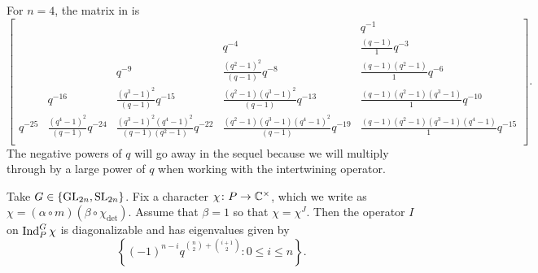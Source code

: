\begin{example}
    For $n=4$, the matrix in  is
    \[\begin{bmatrix}  &   &   &   & q^{-1}\\  &   &   & q^{-4}  & \frac{ ( q - 1 ) }{1} q^{-3}\\  &   & q^{-9}  & \frac{ ( q^{2} - 1 ) ^{2} }{ ( q - 1 ) } q^{-8}  & \frac{ ( q - 1 ) ( q^{2} - 1 ) }{1} q^{-6}\\  & q^{-16}  & \frac{ ( q^{3} - 1 ) ^{2} }{ ( q - 1 ) } q^{-15}  & \frac{ ( q^{2} - 1 ) ( q^{3} - 1 ) ^{2} }{ ( q - 1 ) } q^{-13}  & \frac{ ( q - 1 ) ( q^{2} - 1 ) ( q^{3} - 1 ) }{1} q^{-10}\\q^{-25}  & \frac{ ( q^{4} - 1 ) ^{2} }{ ( q - 1 ) } q^{-24}  & \frac{ ( q^{3} - 1 ) ^{2} ( q^{4} - 1 ) ^{2} }{ ( q - 1 ) ( q^{2} - 1 ) } q^{-22}  & \frac{ ( q^{2} - 1 ) ( q^{3} - 1 ) ( q^{4} - 1 ) ^{2} }{ ( q - 1 ) } q^{-19}  & \frac{ ( q - 1 ) ( q^{2} - 1 ) ( q^{3} - 1 ) ( q^{4} - 1 ) }{1} q^{-15}\\\end{bmatrix}.\]
    The negative powers of $q$ will go away in the sequel because we will multiply through by a large power of $q$ when working with the intertwining operator.
\end{example}
\begin{theorem} \label{thm:eigens-gl}
    Take $G\in\{\mathrm{GL}_{2n},\mathrm{SL}_{2n}\}$. Fix a character $\chi\colon P\to\mathbb C^\times$, which we write as $\chi=(\alpha\circ m)(\beta\circ\chi_{\det})$. Assume that $\beta=1$ so that $\chi=\chi^J$. Then the operator $I$ on $\operatorname{Ind}_P^G\chi$ is diagonalizable and has eigenvalues given by
    \[\left\{(-1)^{n-i}q^{\binom n2+\binom{i+1}2}:0\le i\le n\right\}.\]
\end{theorem}
